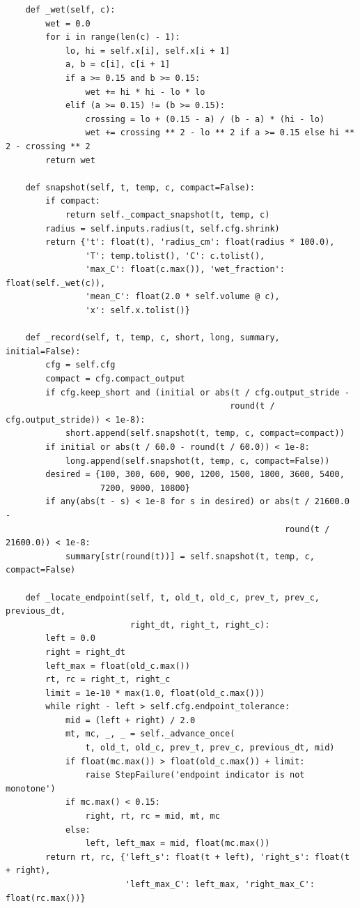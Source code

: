\begin{verbatim}
    def _wet(self, c):
        wet = 0.0
        for i in range(len(c) - 1):
            lo, hi = self.x[i], self.x[i + 1]
            a, b = c[i], c[i + 1]
            if a >= 0.15 and b >= 0.15:
                wet += hi * hi - lo * lo
            elif (a >= 0.15) != (b >= 0.15):
                crossing = lo + (0.15 - a) / (b - a) * (hi - lo)
                wet += crossing ** 2 - lo ** 2 if a >= 0.15 else hi ** 2 - crossing ** 2
        return wet

    def snapshot(self, t, temp, c, compact=False):
        if compact:
            return self._compact_snapshot(t, temp, c)
        radius = self.inputs.radius(t, self.cfg.shrink)
        return {'t': float(t), 'radius_cm': float(radius * 100.0),
                'T': temp.tolist(), 'C': c.tolist(),
                'max_C': float(c.max()), 'wet_fraction': float(self._wet(c)),
                'mean_C': float(2.0 * self.volume @ c),
                'x': self.x.tolist()}

    def _record(self, t, temp, c, short, long, summary, initial=False):
        cfg = self.cfg
        compact = cfg.compact_output
        if cfg.keep_short and (initial or abs(t / cfg.output_stride -
                                             round(t / cfg.output_stride)) < 1e-8):
            short.append(self.snapshot(t, temp, c, compact=compact))
        if initial or abs(t / 60.0 - round(t / 60.0)) < 1e-8:
            long.append(self.snapshot(t, temp, c, compact=False))
        desired = {100, 300, 600, 900, 1200, 1500, 1800, 3600, 5400,
                   7200, 9000, 10800}
        if any(abs(t - s) < 1e-8 for s in desired) or abs(t / 21600.0 -
                                                        round(t / 21600.0)) < 1e-8:
            summary[str(round(t))] = self.snapshot(t, temp, c, compact=False)

    def _locate_endpoint(self, t, old_t, old_c, prev_t, prev_c, previous_dt,
                         right_dt, right_t, right_c):
        left = 0.0
        right = right_dt
        left_max = float(old_c.max())
        rt, rc = right_t, right_c
        limit = 1e-10 * max(1.0, float(old_c.max()))
        while right - left > self.cfg.endpoint_tolerance:
            mid = (left + right) / 2.0
            mt, mc, _, _ = self._advance_once(
                t, old_t, old_c, prev_t, prev_c, previous_dt, mid)
            if float(mc.max()) > float(old_c.max()) + limit:
                raise StepFailure('endpoint indicator is not monotone')
            if mc.max() < 0.15:
                right, rt, rc = mid, mt, mc
            else:
                left, left_max = mid, float(mc.max())
        return rt, rc, {'left_s': float(t + left), 'right_s': float(t + right),
                        'left_max_C': left_max, 'right_max_C': float(rc.max())}


\end{verbatim}
